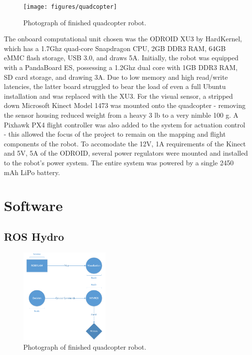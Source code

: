 \documentclass[letterpaper, oneside, 10pt]{report}
\begin{document}
\begin{figure}[h!]
 \caption{Photograph of finished quadcopter robot.}
 \centering
   \texttt{[image: figures/quadcopter]}
\end{figure}

\noindent The onboard computational unit chosen was the ODROID XU3 by HardKernel, which has a 1.7Ghz quad-core Snapdragon CPU, 2GB DDR3 RAM, 64GB eMMC flash storage, USB 3.0, and draws 5A. Initially, the robot was equipped with a PandaBoard ES, possessing a 1.2Ghz dual core with 1GB DDR3 RAM, SD card storage, and drawing 3A. Due to low memory and high read/write latencies, the latter board struggled to bear the load of even a full Ubuntu installation and was replaced with the XU3. For the visual sensor, a stripped down Microsoft Kinect Model 1473 was mounted onto the quadcopter - removing the sensor housing reduced weight from a heavy 3 lb to a very nimble 100 g. A Pixhawk PX4 flight controller was also added to the system for actuation control - this allowed the focus of the project to remain on the mapping and flight components of the robot. To accomodate the 12V, 1A requirements of the Kinect and 5V, 5A of the ODROID, several power regulators were mounted and installed to the robot's power system. The entire system was powered by a single 2450 mAh LiPo battery.

\section{Software}

\subsection{ROS Hydro}

\begin{figure}[h!]
 \caption{Photograph of finished quadcopter robot.}
 \centering
   \includegraphics[width=0.4\textwidth]{images/ros_arch}
\end{figure}
\end{document}
